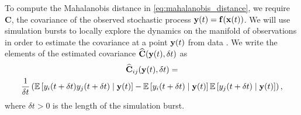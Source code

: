 To compute the Mahalanobis distance in \eqref{eq:mahalanobis_distance}, we require $\mathbf{C}$, the covariance of the observed stochastic process $\mathbf{y}(t) = \mathbf{f}( \mathbf{x}(t))$.
%
We will use simulation bursts to locally explore the dynamics on the manifold of observations in order to estimate the covariance at a point $\mathbf{y}(t)$ from data \cite{talmon2014manifold, talmon2014intrinsic}.
%
We write the elements of the estimated covariance $\widehat{\mathbf{C}}(\mathbf{y}(t), \delta t)$ as
\begin{multline}\label{eq:estimated_cov_expected_value}
\widehat{\mathbf{C}}_{ij}(\mathbf{y}(t), \delta t)
= \\
\frac{1}{\delta t} \left( \mathbb{E} \left[ y_i (t+\delta t) y_j (t+ \delta t) \mid \mathbf{y}(t) \right]
- \mathbb{E} \left[ y_i (t+\delta t) \mid \mathbf{y}(t) \right] \mathbb{E} \left[ y_j (t+\delta t) \mid \mathbf{y}(t) \right] \right) ,
\end{multline}
%
where $\delta t > 0$ is the length of the simulation burst.


